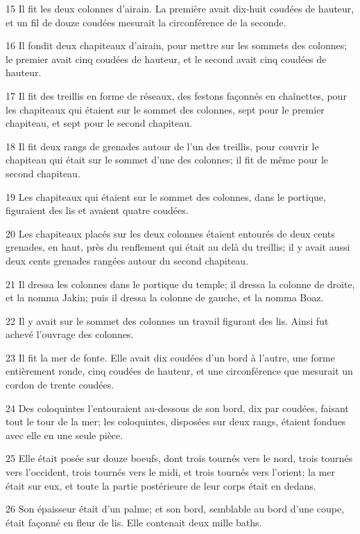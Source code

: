 \par 15 Il fit les deux colonnes d'airain. La première avait dix-huit coudées de hauteur, et un fil de douze coudées mesurait la circonférence de la seconde.
\par 16 Il fondit deux chapiteaux d'airain, pour mettre sur les sommets des colonnes; le premier avait cinq coudées de hauteur, et le second avait cinq coudées de hauteur.
\par 17 Il fit des treillis en forme de réseaux, des festons façonnés en chaînettes, pour les chapiteaux qui étaient sur le sommet des colonnes, sept pour le premier chapiteau, et sept pour le second chapiteau.
\par 18 Il fit deux rangs de grenades autour de l'un des treillis, pour couvrir le chapiteau qui était sur le sommet d'une des colonnes; il fit de même pour le second chapiteau.
\par 19 Les chapiteaux qui étaient sur le sommet des colonnes, dans le portique, figuraient des lis et avaient quatre coudées.
\par 20 Les chapiteaux placés sur les deux colonnes étaient entourés de deux cents grenades, en haut, près du renflement qui était au delà du treillis; il y avait aussi deux cents grenades rangées autour du second chapiteau.
\par 21 Il dressa les colonnes dans le portique du temple; il dressa la colonne de droite, et la nomma Jakin; puis il dressa la colonne de gauche, et la nomma Boaz.
\par 22 Il y avait sur le sommet des colonnes un travail figurant des lis. Ainsi fut achevé l'ouvrage des colonnes.
\par 23 Il fit la mer de fonte. Elle avait dix coudées d'un bord à l'autre, une forme entièrement ronde, cinq coudées de hauteur, et une circonférence que mesurait un cordon de trente coudées.
\par 24 Des coloquintes l'entouraient au-dessous de son bord, dix par coudées, faisant tout le tour de la mer; les coloquintes, disposées sur deux rangs, étaient fondues avec elle en une seule pièce.
\par 25 Elle était posée sur douze boeufs, dont trois tournés vers le nord, trois tournés vers l'occident, trois tournés vers le midi, et trois tournés vers l'orient; la mer était sur eux, et toute la partie postérieure de leur corps était en dedans.
\par 26 Son épaisseur était d'un palme; et son bord, semblable au bord d'une coupe, était façonné en fleur de lis. Elle contenait deux mille baths.
